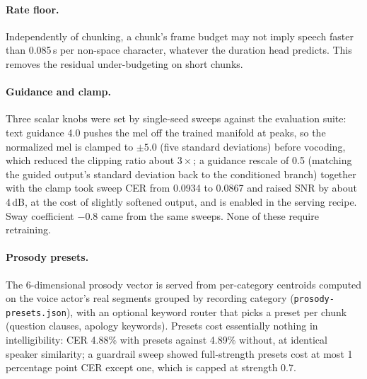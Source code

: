 \documentclass[10pt,twocolumn]{article}
\newcommand{\code}[1]{\texttt{#1}}
\begin{document}
\paragraph{Rate floor.} Independently of chunking, a chunk's frame budget may not imply speech faster than 0.085\,s per non-space character, whatever the duration head predicts. This removes the residual under-budgeting on short chunks.

\paragraph{Guidance and clamp.} Three scalar knobs were set by single-seed sweeps against the evaluation suite: text guidance 4.0 pushes the mel off the trained manifold at peaks, so the normalized mel is clamped to $\pm5.0$ (five standard deviations) before vocoding, which reduced the clipping ratio about $3\times$; a guidance rescale of 0.5 (matching the guided output's standard deviation back to the conditioned branch) together with the clamp took sweep CER from 0.0934 to 0.0867 and raised SNR by about 4\,dB, at the cost of slightly softened output, and is enabled in the serving recipe. Sway coefficient $-0.8$ came from the same sweeps. None of these require retraining.

\paragraph{Prosody presets.} The 6-dimensional prosody vector is served from per-category centroids computed on the voice actor's real segments grouped by recording category (\code{prosody-presets.json}), with an optional keyword router that picks a preset per chunk (question clauses, apology keywords). Presets cost essentially nothing in intelligibility: CER 4.88\% with presets against 4.89\% without, at identical speaker similarity; a guardrail sweep showed full-strength presets cost at most 1 percentage point CER except one, which is capped at strength 0.7.
\end{document}

